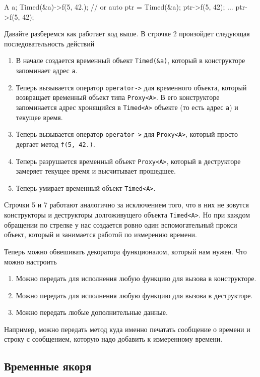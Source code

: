 \begin{cppcode}
A a;
Timed(&a)->f(5, 42.);
// or
auto ptr = Timed(&a);
ptr->f(5, 42);
...
ptr->f(5, 42);
\end{cppcode}
Давайте разберемся как работает код выше.
В строчке 2 произойдет следующая последовательность действий
\begin{enumerate}
\item В начале создается временный объект \verb"Timed(&a)", который в конструкторе запоминает адрес \verb"a".

\item Теперь вызывается оператор \verb"operator->" для временного объекта, который возвращает временный объект типа \verb"Proxy<A>".
В его конструкторе запоминается адрес хронящийся в \verb"Timed<A>" объекте (то есть адрес \verb"a") и текущее время.

\item Теперь вызывается оператор \verb"operator->" для \verb"Proxy<A>", который просто дергает метод \verb"f(5, 42.)".

\item Теперь разрушается временный объект \verb"Proxy<A>", который в деструкторе замеряет текущее время и высчитывает прошедшее.

\item Теперь умирает временный объект \verb"Timed<A>".
\end{enumerate}

Строчки 5 и 7 работают аналогично за исключением того, что в них не зовутся конструкторы и деструкторы долгоживущего объекта \verb"Timed<A>".
Но при каждом обращении по стрелке у нас создается ровно один вспомогательный прокси объект, который и занимается работой по измерению времени.

Теперь можно обвешивать декоратора функционалом, который нам нужен.
Что можно настроить
\begin{enumerate}
\item Можно передать для исполнения любую функцию для вызова в конструкторе.

\item Можно передать для исполнения любую функцию для вызова в деструкторе.

\item Можно передать любые дополнительные данные.
\end{enumerate}
Например, можно передать метод куда именно печатать сообщение о времени и строку с сообщением, которую надо добавить к измеренному времени.

\subsection{Временные якоря}

